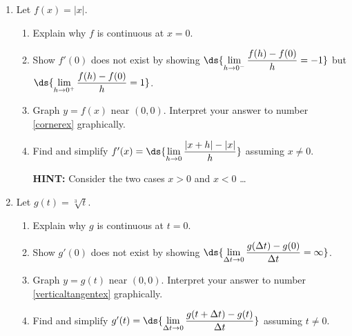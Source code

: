 \documentclass{ximera}
\begin{document}
\begin{enumerate}
\setcounter{enumi}{\value{HW}}

\item Let  $f(x) =|x|$.  

\begin{enumerate}

\item  Explain why $f$ is continuous at $x = 0$.

\item\label{cornerex} Show $f'(0)$ does not exist by showing $\ds{\lim_{h \rightarrow 0^{-}} \dfrac{f(h) - f(0)}{h} =-1}$ but  $\ds{\lim_{h \rightarrow 0^{+}} \dfrac{f(h) - f(0)}{h} = 1}$.  

\smallskip
        
\item  Graph $y = f(x)$ near $(0,0)$.  Interpret your answer to number \ref{cornerex} graphically.

\smallskip

\item  Find and simplify  $f'(x) =  \ds{\lim_{h \rightarrow 0} \dfrac{|x+h| - |x|}{h}}$ assuming $x \neq 0$.

\smallskip

\textbf{HINT:}  Consider the two cases $x > 0$ and $x < 0$ \ldots
        
\smallskip

\end{enumerate}


\item Let  $g(t) = \sqrt[3]{t}$.  

\begin{enumerate}

\item Explain why $g$ is continuous at $t = 0$.

\item\label{verticaltangentex} Show $g'(0)$ does not exist by showing $\ds{\lim_{\Delta t \rightarrow 0} \dfrac{g(\Delta t) - g(0)}{\Delta t} = \infty}$.  

\smallskip
        
\item  Graph $y = g(t)$ near $(0,0)$.  Interpret your answer to number \ref{verticaltangentex} graphically.

\smallskip

\item  Find and simplify  $g'(t) =  \ds{\lim_{\Delta t \rightarrow 0} \dfrac{g(t+\Delta t) - g(t)}{\Delta t}}$ assuming $t \neq 0$.


\end{enumerate}
\end{enumerate}
\end{document}
